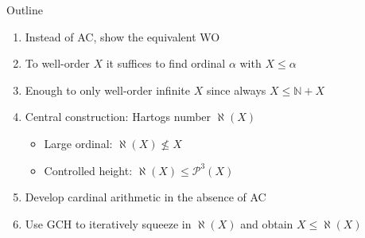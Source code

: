 \documentclass[xcolor=dvipsnames,compress,aspectratio=169,handout]{beamer}
\newcommand{\MBB}[1]{\ensuremath{\mathbb{#1}}\xspace}  %
\newcommand{\MCL}[1]{\ensuremath{\mathcal{#1}}\xspace} %
\newcommand{\Nat}{\MBB{N}}   %
\newcommand{\Pow}{\MCL P}
\newcommand{\hartogsNumber}{\aleph}
\begin{document}
\begin{frame}{Outline}
	\begin{enumerate}[<+->]
			\item
			Instead of AC, show the equivalent WO
			\vspace{0.4cm}
			\item
			To well-order $X$ it suffices to find ordinal $\alpha$ with $X\le \alpha$
			\vspace{0.4cm}
			\item
			Enough to only well-order infinite $X$ since always $X\le\Nat + X$
			\vspace{0.4cm}
			\item
			Central construction: Hartogs number $\hartogsNumber(X)$
			\begin{itemize}
				\item
				\vspace{0.2cm}
				Large ordinal: $\hartogsNumber(X)\not\le X$
				\vspace{0.2cm}
				\item
				Controlled height: $\hartogsNumber(X)\le\Pow^3(X)$
			\end{itemize}
			\vspace{0.4cm}
			\item
			Develop cardinal arithmetic in the absence of AC
			\vspace{0.4cm}
			\item
			Use GCH to iteratively squeeze in $\hartogsNumber(X)$ and obtain $X\le \hartogsNumber(X)$
		\end{enumerate}
\end{frame}
\end{document}
